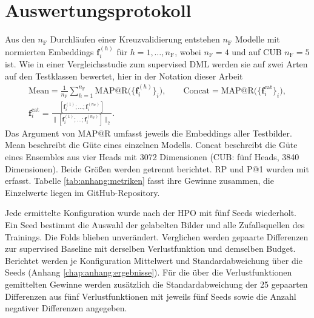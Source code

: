 \section{Auswertungsprotokoll}
\label{sec:protokoll}

Aus den $n_{\mathrm{F}}$ Durchläufen einer Kreuzvalidierung entstehen $n_{\mathrm{F}}$ Modelle mit normierten Embeddings $\bm{f}^{(h)}_i$ für $h=1,\dots,n_{\mathrm{F}}$, wobei $n_{\mathrm{F}}=4$ und auf \ac{CUB} $n_{\mathrm{F}}=5$ ist. Wie in einer Vergleichsstudie zum supervised \ac{DML} werden sie auf zwei Arten auf den Testklassen bewertet, hier in der Notation dieser Arbeit \cite{musgrave_metric_2020}
\begin{equation}
  \begin{gathered}
  \mathrm{Mean}=\frac{1}{n_{\mathrm{F}}}\sum_{h=1}^{n_{\mathrm{F}}}\mathrm{MAP@R}\bigl(\{\bm{f}^{(h)}_i\}_i\bigr),\qquad
  \mathrm{Concat}=\mathrm{MAP@R}\bigl(\{\bm{f}^{\mathrm{cat}}_i\}_i\bigr),\\
  \bm{f}^{\mathrm{cat}}_i=\frac{[\bm{f}^{(1)}_i;\dots;\bm{f}^{(n_{\mathrm{F}})}_i]}{\lVert[\bm{f}^{(1)}_i;\dots;\bm{f}^{(n_{\mathrm{F}})}_i]\rVert_2}.
  \end{gathered}
  \label{eq:concat}
\end{equation}
Das Argument von $\mathrm{MAP@R}$ umfasst jeweils die Embeddings aller Testbilder. Mean beschreibt die Güte eines einzelnen Modells. Concat beschreibt die Güte eines Ensembles aus vier Heads mit 3072 Dimensionen (\ac{CUB}: fünf Heads, 3840 Dimensionen). Beide Größen werden getrennt berichtet. \ac{RP} und \ac{P@1} wurden mit erfasst. Tabelle \ref{tab:anhang:metriken} fasst ihre Gewinne zusammen, die Einzelwerte liegen im GitHub-Repository.

Jede ermittelte Konfiguration wurde nach der \ac{HPO} mit fünf Seeds wiederholt. Ein Seed bestimmt die Auswahl der gelabelten Bilder und alle Zufallsquellen des Trainings. Die Folds blieben unverändert. Verglichen werden gepaarte Differenzen zur supervised Baseline mit derselben Verlustfunktion und demselben Budget. Berichtet werden je Konfiguration Mittelwert und Standardabweichung über die Seeds (Anhang \ref{chap:anhang:ergebnisse}). Für die über die Verlustfunktionen gemittelten Gewinne werden zusätzlich die Standardabweichung der 25 gepaarten Differenzen aus fünf Verlustfunktionen mit jeweils fünf Seeds sowie die Anzahl negativer Differenzen angegeben. 

